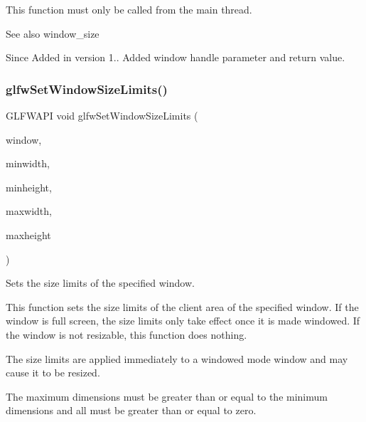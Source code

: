 This function must only be called from the main thread.

\begin{DoxySeeAlso}{See also}
window\+\_\+size
\end{DoxySeeAlso}
\begin{DoxySince}{Since}
Added in version 1..  Added window handle parameter and return value. 
\end{DoxySince}
\mbox{\label{group__window_ga8af814fc98d786d1de2505b40b707de8}} 
\subsubsection{\texorpdfstring{glfw\+Set\+Window\+Size\+Limits()}{glfwSetWindowSizeLimits()}}
{\footnotesize\ttfamily G\+L\+F\+W\+A\+PI void glfw\+Set\+Window\+Size\+Limits (\begin{DoxyParamCaption}\item[{\hyperlink{group__window_ga3c96d80d363e67d13a41b5d1821f3242}{G\+L\+F\+Wwindow} $\ast$}]{window,  }\item[{int}]{minwidth,  }\item[{int}]{minheight,  }\item[{int}]{maxwidth,  }\item[{int}]{maxheight }\end{DoxyParamCaption})}



Sets the size limits of the specified window. 

This function sets the size limits of the client area of the specified window. If the window is full screen, the size limits only take effect once it is made windowed. If the window is not resizable, this function does nothing.

The size limits are applied immediately to a windowed mode window and may cause it to be resized.

The maximum dimensions must be greater than or equal to the minimum dimensions and all must be greater than or equal to zero.


